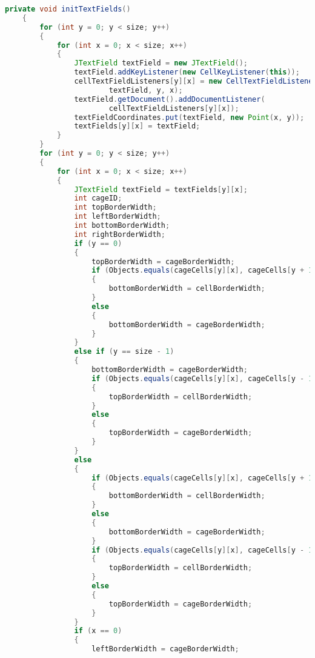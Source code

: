 \begin{lstlisting}[language=Java,basicstyle=\tiny,caption=GUI.java]
    private void initTextFields()
    {
        for (int y = 0; y < size; y++)
        {
            for (int x = 0; x < size; x++)
            {
                JTextField textField = new JTextField();
                textField.addKeyListener(new CellKeyListener(this));
                cellTextFieldListeners[y][x] = new CellTextFieldListener(c, 
                        textField, y, x);
                textField.getDocument().addDocumentListener(
                        cellTextFieldListeners[y][x]);
                textFieldCoordinates.put(textField, new Point(x, y));
                textFields[y][x] = textField;
            }   
        }
        for (int y = 0; y < size; y++)
        {
            for (int x = 0; x < size; x++)
            {
                JTextField textField = textFields[y][x];
                int cageID;
                int topBorderWidth;
                int leftBorderWidth;
                int bottomBorderWidth;
                int rightBorderWidth;
                if (y == 0)
                {
                    topBorderWidth = cageBorderWidth;
                    if (Objects.equals(cageCells[y][x], cageCells[y + 1][x]))
                    {
                        bottomBorderWidth = cellBorderWidth;
                    }
                    else
                    {
                        bottomBorderWidth = cageBorderWidth;
                    }
                }
                else if (y == size - 1)
                {
                    bottomBorderWidth = cageBorderWidth;
                    if (Objects.equals(cageCells[y][x], cageCells[y - 1][x]))
                    {
                        topBorderWidth = cellBorderWidth;
                    }
                    else
                    {
                        topBorderWidth = cageBorderWidth;
                    }
                }
                else
                {
                    if (Objects.equals(cageCells[y][x], cageCells[y + 1][x]))
                    {
                        bottomBorderWidth = cellBorderWidth;
                    }
                    else
                    {
                        bottomBorderWidth = cageBorderWidth;
                    }
                    if (Objects.equals(cageCells[y][x], cageCells[y - 1][x]))
                    {
                        topBorderWidth = cellBorderWidth;
                    }
                    else
                    {
                        topBorderWidth = cageBorderWidth;
                    }
                }
                if (x == 0)
                {
                    leftBorderWidth = cageBorderWidth;

\end{lstlisting}
